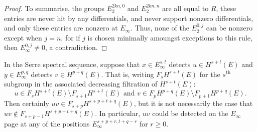 \begin{proof}
To summarise, the groups $E_2^{2kn,0}$ and $E_2^{2kn,n}$ are all equal to $R$, these entries are never hit by any differentials, and never support nonzero differentials, and only these entries are nonzero at $E_\infty$. Thus, none of the $E_2^{0,j}$ can be nonzero except when $j=n$, for if $j$ is chosen minimally amoungst exceptions to this rule, then $E_\infty^{0,j}\neq0$, a contradiction.
%
%
%
\end{proof}
\begin{subtlety}\label{EinftyProductSubtlety}
In the Serre spectral sequence, suppose that $x\in E^{s,t}_\infty$ detects $u\in H^{s+t}(E)$ and $y\in E^{p,q}_\infty$ detects $v\in H^{p+q}(E)$. That is, writing $F_sH^{s+t}(E)$ for the $s^\text{th}$ subgroup in the associated decreasing filtration of $H^{s+t}(E)$:
\[u\in F_sH^{s+t}(E)\setminus F_{s+1}H^{s+t}(E)\text{ and }v\in F_pH^{p+q}(E)\setminus F_{p+1}H^{p+q}(E).\]
Then certainly $uv\in F_{s+p}H^{s+p+t+q}(E)$, but it is not necessarily the case that $uv\notin F_{s+p-1}H^{s+p+t+q}(E)$. In particular, $uv$ could be detected on the $E_\infty$ page at any of the positions $E_\infty^{s+p+r,t+q-r}$ for $r\geq0$.
\end{subtlety}


